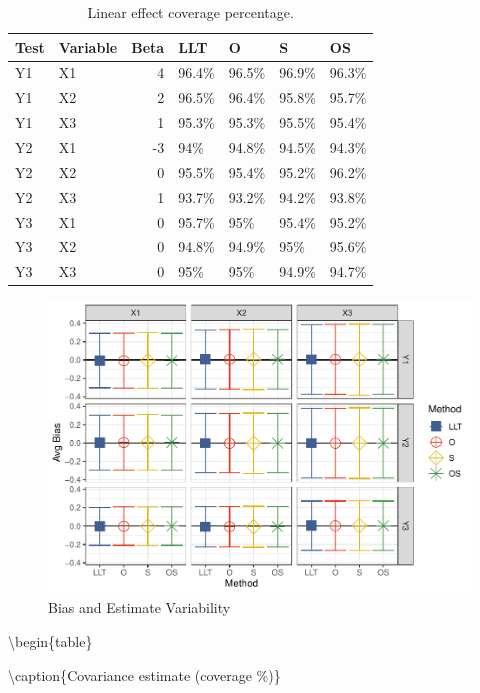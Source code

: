 \documentclass[
]{article}
\begin{document}
\begin{table}

\caption{\label{tab:unnamed-chunk-9}Linear effect coverage percentage.}
\centering
\begin{tabular}[t]{llrllll}
\toprule
Test & Variable & Beta & LLT & O & S & OS\\
\midrule
Y1 & X1 & 4 & 96.4\% & 96.5\% & 96.9\% & 96.3\%\\
Y1 & X2 & 2 & 96.5\% & 96.4\% & 95.8\% & 95.7\%\\
Y1 & X3 & 1 & 95.3\% & 95.3\% & 95.5\% & 95.4\%\\
Y2 & X1 & -3 & 94\% & 94.8\% & 94.5\% & 94.3\%\\
Y2 & X2 & 0 & 95.5\% & 95.4\% & 95.2\% & 96.2\%\\
\addlinespace
Y2 & X3 & 1 & 93.7\% & 93.2\% & 94.2\% & 93.8\%\\
Y3 & X1 & 0 & 95.7\% & 95\% & 95.4\% & 95.2\%\\
Y3 & X2 & 0 & 94.8\% & 94.9\% & 95\% & 95.6\%\\
Y3 & X3 & 0 & 95\% & 95\% & 94.9\% & 94.7\%\\
\bottomrule
\end{tabular}
\end{table}

\begin{figure}
\centering
\includegraphics{FullSimulation_files/figure-latex/unnamed-chunk-10-1.pdf}
\caption{\label{fig:unnamed-chunk-10}Bias and Estimate Variability}
\end{figure}

\textbackslash begin\{table\}

\textbackslash caption\{\label{tab:unnamed-chunk-11}Covariance estimate (coverage \%)\}
\centering
\end{document}
